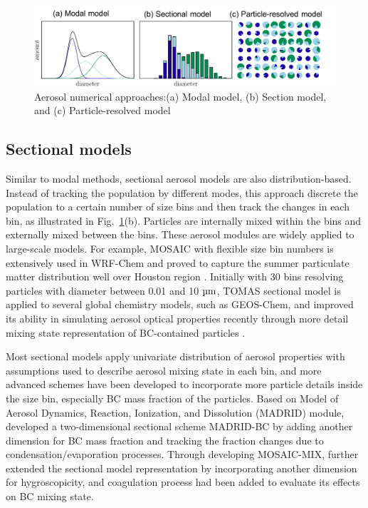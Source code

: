 \documentclass[edeposit,fullpage]{uiucthesis2009}
\begin{document}
\begin{figure}
	\centering
	\includegraphics[scale=0.5]{chap1_figs/thesis_chap1_fig5.pdf}
	\caption{Aerosol numerical approaches:(a) Modal model, (b) Section model, and (c) Particle-resolved model}
	\label{fig:chap1-aerosol-model}
\end{figure}

\subsection{Sectional models}
Similar to modal methods, sectional aerosol models are also distribution-based. Instead of tracking the population by different modes, this approach discrete the population to a certain number of size bins and then track the changes in each bin, as illustrated in Fig.~\ref{fig:chap1-aerosol-model}(b). Particles are internally mixed within the bins and externally mixed between the bins. These aerosol modules are widely applied to large-scale models. For example, MOSAIC with flexible size bin numbers is extensively used in WRF-Chem and proved to capture the summer particulate matter distribution well over Houston region \citep{zaveri2008model,fast2006evolution}. Initially with 30 bins resolving particles with diameter between 0.01 and 10 $\rm \mu m$, TOMAS sectional model is applied to several global chemistry models, such as GEOS-Chem, and improved its ability in simulating aerosol optical properties recently through more detail mixing state representation of BC-contained particles \citep{adams2002predicting,pierce2013weak,kodros2018size}.

Most sectional models apply univariate distribution of aerosol properties with assumptions used to describe aerosol mixing state in each bin, and more advanced schemes have been developed to incorporate more particle details inside the size bin, especially BC mass fraction of the particles. Based on Model of Aerosol Dynamics, Reaction, Ionization, and Dissolution (MADRID) module, \citet{oshima2009aging} developed a two-dimensional sectional scheme MADRID-BC by adding another dimension for BC mass fraction and tracking the fraction changes due to condensation/evaporation processes. Through developing MOSAIC-MIX, \citet{ching2016three} further extended the sectional model representation by incorporating another dimension for hygroscopicity, and coagulation process had been added to evaluate its effects on BC mixing state. 
\end{document}
